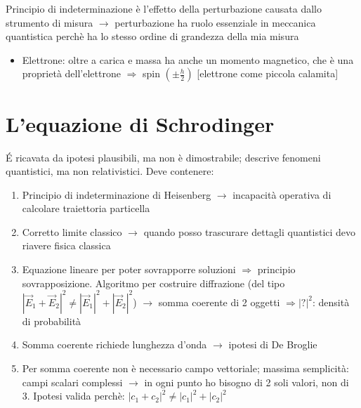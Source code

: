 \documentclass[a4paper,11pt]{report}
\theoremstyle{remark}
\theoremstyle{definition}
\begin{document}
\noindent Principio di indeterminazione è l'effetto della perturbazione causata dallo strumento di misura $\rightarrow$ perturbazione ha ruolo essenziale in meccanica quantistica perchè ha lo stesso ordine di grandezza della mia misura
\begin{itemize}
    \item Elettrone: oltre a carica e massa ha anche un momento magnetico, che è una proprietà dell'elettrone $\Rightarrow$ spin $\left(\pm \frac{h}{2}\right)$ [elettrone come piccola calamita]
\end{itemize}

\chapter{L'equazione di Schrodinger}
\'E ricavata da ipotesi plausibili, ma non è dimostrabile; descrive fenomeni quantistici, ma non relativistici. \newline
Deve contenere: 
\begin{enumerate}
    \item Principio di indeterminazione di Heisenberg $\rightarrow$ incapacità operativa di calcolare traiettoria particella
    \item Corretto limite classico $\rightarrow$ quando posso trascurare dettagli quantistici devo riavere fisica classica
    \item Equazione lineare per poter sovrapporre soluzioni $\Rightarrow$ principio sovrapposizione. Algoritmo per costruire diffrazione (del tipo ${|\vec{E}_1 + \vec{E}_2|}^2 \neq {|\vec{E}_1|}^2 + {|\vec{E}_2|}^2$) $\rightarrow$ somma coerente di 2 oggetti $\Rightarrow {|?|}^2$: densità di probabilità
    \item Somma coerente richiede lunghezza d'onda $\rightarrow$ ipotesi di De Broglie
    \item Per somma coerente non è necessario campo vettoriale; massima semplicità: campi scalari complessi $\rightarrow$ in ogni punto ho bisogno di 2 soli valori, non di 3. Ipotesi valida perchè: ${|c_1 + c_2|}^2 \neq {|c_1|}^2 + {|c_2|}^2$
\end{enumerate}
\end{document}
